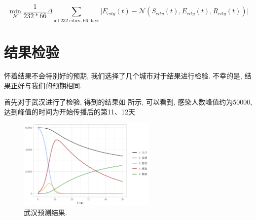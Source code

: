 \documentclass[lang=cn,11pt]{elegantpaper}
\begin{document}
\begin{equation}
	\min_{\mathcal N} \dfrac{1}{232*66}\Delta \sum_{\text{all 232 cities, 66 days}}\Big|E_{city}(t)-\mathcal N(S_{city}(t),E_{city}(t),R_{city}(t))\Big|
\end{equation}

\section{结果检验}
怀着结果不会特别好的预期, 我们选择了几个城市对于结果进行检验. 不幸的是, 结果正好与我们的预期相同. 

首先对于武汉进行了检验, 得到的结果如 所示, 可以看到, 感染人数峰值约为50000, 达到峰值的时间为开始传播后的第11、12天
\begin{figure}[htbp]
  \centering
  \hspace{25pt}\includegraphics[width=0.6\textwidth]{wh1}
  \caption{武汉预测结果. \label{fig:wh}}
\end{figure}

\newpage
\nocite{*}



\end{document}
